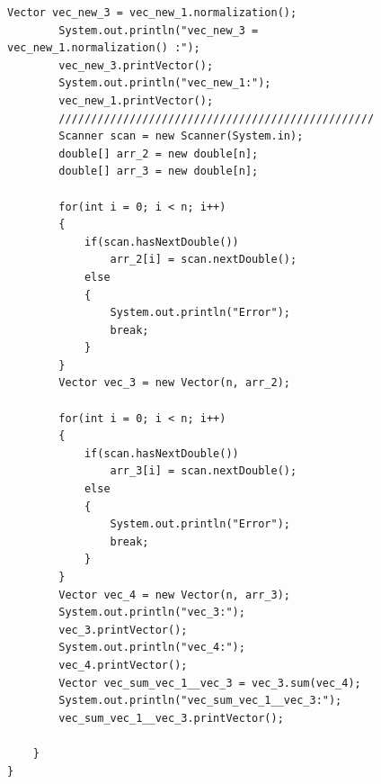 \documentclass[a4paper, 14pt]{extarticle}
\begin{document}
\begin{figure}[!htb]
\begin{lstlisting}[language={},caption={класс Test(продолжение)},label={lst:code2}]
        Vector vec_new_3 = vec_new_1.normalization();
        System.out.println("vec_new_3 = vec_new_1.normalization() :");
        vec_new_3.printVector();
        System.out.println("vec_new_1:");
        vec_new_1.printVector();
        /////////////////////////////////////////////////
        Scanner scan = new Scanner(System.in);
        double[] arr_2 = new double[n];
        double[] arr_3 = new double[n];

        for(int i = 0; i < n; i++)
        {
            if(scan.hasNextDouble())
                arr_2[i] = scan.nextDouble();
            else
            {
                System.out.println("Error");
                break;
            }
        }
        Vector vec_3 = new Vector(n, arr_2);

        for(int i = 0; i < n; i++)
        {
            if(scan.hasNextDouble())
                arr_3[i] = scan.nextDouble();
            else
            {
                System.out.println("Error");
                break;
            }
        }
        Vector vec_4 = new Vector(n, arr_3);
        System.out.println("vec_3:");
        vec_3.printVector();
        System.out.println("vec_4:");
        vec_4.printVector();
        Vector vec_sum_vec_1__vec_3 = vec_3.sum(vec_4);
        System.out.println("vec_sum_vec_1__vec_3:");
        vec_sum_vec_1__vec_3.printVector();

    }
}
\end{lstlisting}
\end{figure}
\end{document}
